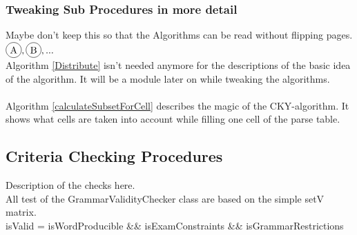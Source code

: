 \pagebreak

\subsubsection{Tweaking Sub Procedures in more detail}
Maybe don't keep this so that the Algorithms can be read without flipping pages.\\
$\circled{A}, \circled{B}, ...$\\
\noindent
{}
Algorithm \ref{Distribute} isn't needed anymore for the descriptions of the basic idea of the algorithm. It will be a module later on while tweaking the algorithms.
\\
\\
Algorithm \ref{calculateSubsetForCell} describes the magic of the CKY-algorithm. It shows what cells are taken into account while filling one cell of the parse table.

\pagebreak

\subsection{Criteria Checking Procedures}
\noindent Description of the checks here. \\
\noindent All test of the GrammarValidityChecker class are based on the simple setV matrix. \\

\noindent  isValid = isWordProducible \&\& isExamConstraints \&\& isGrammarRestrictions\\

